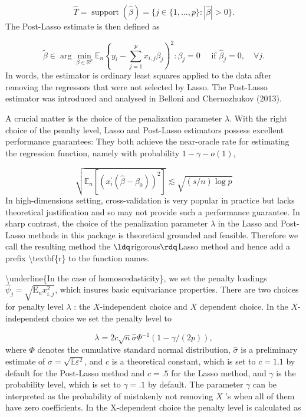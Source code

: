 \documentclass[12pt,a4paper]{article}
\begin{document}
\[
\hat{T}=\operatorname{support}(\hat{\beta})=\{j \in\{1, \ldots, p\}:|\hat{\beta}|>0\}.
\]
The Post-Lasso estimate is then defined as

\[
\tilde{\beta} \in \arg \min _{\beta \in \mathbb{R}^p} \mathbb{E}_n\left\{y_i-\sum_{j=1}^p x_{i, j} \beta_j\right)^2: \beta_j=0 \quad \text { if } \hat{\beta}_j=0, \quad \forall j.
\]
In words, the estimator is ordinary least squares applied to the data after removing the regressors that were not selected by Lasso. The Post-Lasso estimator was introduced and analysed in Belloni and Chernozhukov (2013).

A crucial matter is the choice of the penalization parameter $\lambda$. With the right choice of the penalty level, Lasso and Post-Lasso estimators possess excellent performance guarantees: They both achieve the near-oracle rate for estimating the regression function, namely with probability $1 - \gamma - o(1)$,

\[
\sqrt{\mathbb{E}_n\left[\left(x_i^{\prime}\left(\hat{\beta}-\beta_0\right)\right)^2\right]} \lesssim \sqrt{(s / n) \log p}
\]
In high-dimensions setting, cross-validation is very popular in practice but lacks theoretical justification and so may not provide such a performance guarantee. In sharp contrast, the choice of the penalization parameter $\lambda$ in the Lasso and Post-Lasso methods in this package is theoretical grounded and feasible. Therefore we call the resulting method the \ensuremath{\ldq}rigorous\ensuremath{\rdq}Lasso method and hence add a prefix {\textbackslash}textbf\{r\} to the function names.

{\textbackslash}underline\{In the case of homoscedasticity\}, we set the penalty loadings $\hat{\psi}_j=\sqrt{\mathrm{E}_n x_{i, j}^2}$, which insures basic equivariance properties. There are two choices for penalty level $\lambda$ : the $X$-independent choice and $X$ dependent choice. In the $X$-independent choice we set the penalty level to

\[
\lambda=2 c \sqrt{n} \hat{\sigma} \Phi^{-1}(1-\gamma /(2 p)),
\]
where $\Phi$ denotes the cumulative standard normal distribution, $\hat{\sigma}$ is a preliminary estimate of $\sigma=\sqrt{\mathbb{E} \varepsilon^2}$, and $c$ is a theoretical constant, which is set to $c=1.1$ by default for the Post-Lasso method and $c=.5$ for the Lasso method, and $\gamma$ is the probability level, which is set to $\gamma=.1$ by default. The parameter $\gamma$ can be interpreted as the probability of mistakenly not removing $X$ 's when all of them have zero coefficients. In the X-dependent choice the penalty level is calculated as
\end{document}
